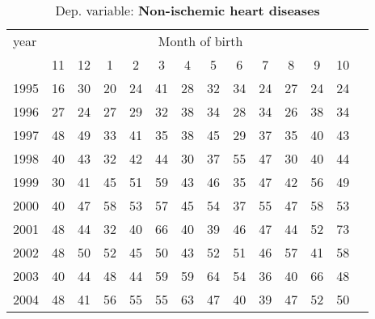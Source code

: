  \begin{table}[H] \begin{threeparttable} \centering \caption{Dep. variable: \textbf{Non-ischemic heart diseases}} {\def\sym#1{\ifmmode^{#1}\else\(^{#1}\)\fi} \begin{tabular}{l*{13}{c}} \toprule year & \multicolumn{12}{c}{Month of birth} \\ \cmidrule(lr){2-13} 
            &          11&          12&           1&           2&           3&           4&           5&           6&           7&           8&           9&          10\\
1995        &          16&          30&          20&          24&          41&          28&          32&          34&          24&          27&          24&          24\\
1996        &          27&          24&          27&          29&          32&          38&          34&          28&          34&          26&          38&          34\\
1997        &          48&          49&          33&          41&          35&          38&          45&          29&          37&          35&          40&          43\\
1998        &          40&          43&          32&          42&          44&          30&          37&          55&          47&          30&          40&          44\\
1999        &          30&          41&          45&          51&          59&          43&          46&          35&          47&          42&          56&          49\\
2000        &          40&          47&          58&          53&          57&          45&          54&          37&          55&          47&          58&          53\\
2001        &          48&          44&          32&          40&          66&          40&          39&          46&          47&          44&          52&          73\\
2002        &          48&          50&          52&          45&          50&          43&          52&          51&          46&          57&          41&          58\\
2003        &          40&          44&          48&          44&          59&          59&          64&          54&          36&          40&          66&          48\\
2004        &          48&          41&          56&          55&          55&          63&          47&          40&          39&          47&          52&          50\\

\end{tabular}}
\end{threeparttable}
\end{table}
